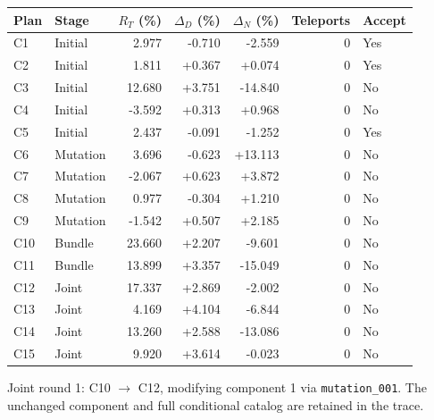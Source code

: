 \begin{longtable}{llrrrrl}

\toprule Plan & Stage & $R_T$ (\%) & $\Delta_D$ (\%) & $\Delta_N$ (\%) & Teleports & Accept \\\midrule\endhead

C1 & Initial & 2.977 & -0.710 & -2.559 & 0 & Yes \\

C2 & Initial & 1.811 & +0.367 & +0.074 & 0 & Yes \\

C3 & Initial & 12.680 & +3.751 & -14.840 & 0 & No \\

C4 & Initial & -3.592 & +0.313 & +0.968 & 0 & No \\

C5 & Initial & 2.437 & -0.091 & -1.252 & 0 & Yes \\

C6 & Mutation & 3.696 & -0.623 & +13.113 & 0 & No \\

C7 & Mutation & -2.067 & +0.623 & +3.872 & 0 & No \\

C8 & Mutation & 0.977 & -0.304 & +1.210 & 0 & No \\

C9 & Mutation & -1.542 & +0.507 & +2.185 & 0 & No \\

C10 & Bundle & 23.660 & +2.207 & -9.601 & 0 & No \\

C11 & Bundle & 13.899 & +3.357 & -15.049 & 0 & No \\

C12 & Joint & 17.337 & +2.869 & -2.002 & 0 & No \\

C13 & Joint & 4.169 & +4.104 & -6.844 & 0 & No \\

C14 & Joint & 13.260 & +2.588 & -13.086 & 0 & No \\

C15 & Joint & 9.920 & +3.614 & -0.023 & 0 & No \\

\bottomrule\end{longtable}

Joint round 1: C10 $\rightarrow$ C12, modifying component 1 via \texttt{mutation\_001}. The unchanged component and full conditional catalog are retained in the trace.

